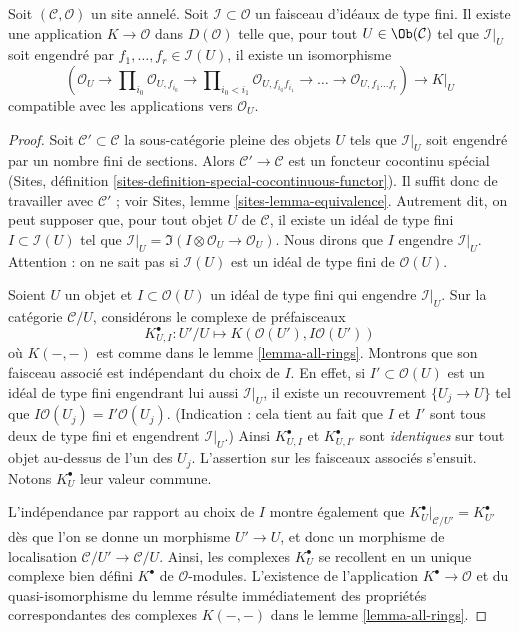 \begin{lemma}
\label{lemma-global-extended-cech-complex}
Soit $(\mathcal{C}, \mathcal{O})$ un site annelé. Soit
$\mathcal{I} \subset \mathcal{O}$ un faisceau d'idéaux de type fini.
Il existe une application $K \to \mathcal{O}$ dans $D(\mathcal{O})$
telle que, pour tout $U \in \Ob(\mathcal{C})$ tel que
$\mathcal{I}|_U$ soit engendré par $f_1, \ldots, f_r \in \mathcal{I}(U)$,
il existe un isomorphisme
$$
(\mathcal{O}_U \to \prod\nolimits_{i_0} \mathcal{O}_{U, f_{i_0}} \to
\prod\nolimits_{i_0 < i_1} \mathcal{O}_{U, f_{i_0}f_{i_1}} \to
\ldots \to \mathcal{O}_{U, f_1\ldots f_r}) \longrightarrow K|_U
$$
compatible avec les applications vers $\mathcal{O}_U$.
\end{lemma}

\begin{proof}
Soit $\mathcal{C}' \subset \mathcal{C}$ la sous-catégorie pleine
des objets $U$ tels que $\mathcal{I}|_U$ soit engendré par
un nombre fini de sections. Alors $\mathcal{C}' \to \mathcal{C}$
est un foncteur cocontinu spécial
(Sites, définition \ref{sites-definition-special-cocontinuous-functor}).
Il suffit donc de travailler avec $\mathcal{C}'$ ; voir
Sites, lemme \ref{sites-lemma-equivalence}.
Autrement dit, on peut supposer que, pour tout
objet $U$ de $\mathcal{C}$, il existe un idéal de type fini
$I \subset \mathcal{I}(U)$ tel que
$\mathcal{I}|_U = \Im(I \otimes \mathcal{O}_U \to \mathcal{O}_U)$.
Nous dirons que $I$ engendre $\mathcal{I}|_U$.
Attention : on ne sait pas si $\mathcal{I}(U)$ est un idéal de type fini
de $\mathcal{O}(U)$.

\medskip\noindent
Soient $U$ un objet et $I \subset \mathcal{O}(U)$ un idéal de type
fini qui engendre $\mathcal{I}|_U$.
Sur la catégorie $\mathcal{C}/U$, considérons le complexe de préfaisceaux
$$
K_{U, I}^\bullet : U'/U \longmapsto K(\mathcal{O}(U'), I\mathcal{O}(U'))
$$
où $K(-, -)$ est comme dans le lemme \ref{lemma-all-rings}.
Montrons que son faisceau associé est indépendant
du choix de $I$. En effet, si $I' \subset \mathcal{O}(U)$
est un idéal de type fini engendrant lui aussi $\mathcal{I}|_U$,
il existe un recouvrement $\{U_j \to U\}$ tel que
$I\mathcal{O}(U_j) = I'\mathcal{O}(U_j)$. (Indication : cela tient au fait que
$I$ et $I'$ sont tous deux de type fini et engendrent $\mathcal{I}|_U$.)
Ainsi $K_{U, I}^\bullet$ et $K_{U, I'}^\bullet$ sont {\it identiques}
sur tout objet au-dessus de l'un des $U_j$. L'assertion
sur les faisceaux associés s'ensuit. Notons $K_U^\bullet$ leur valeur commune.

\medskip\noindent
L'indépendance par rapport au choix de $I$ montre également que
$K_U^\bullet|_{\mathcal{C}/U'} = K_{U'}^\bullet$
dès que l'on se donne un morphisme
$U' \to U$, et donc un morphisme de localisation
$\mathcal{C}/U' \to \mathcal{C}/U$. Ainsi, les complexes
$K_U^\bullet$ se recollent en un unique complexe bien défini $K^\bullet$
de $\mathcal{O}$-modules. L'existence de l'application $K^\bullet \to \mathcal{O}$
et du quasi-isomorphisme du lemme résulte immédiatement
des propriétés correspondantes des complexes $K(-, -)$ dans le
lemme \ref{lemma-all-rings}.
\end{proof}


